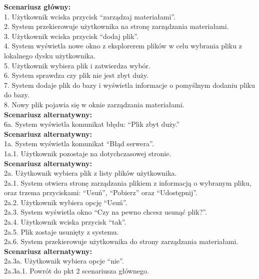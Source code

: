\begin{enumerate}[label=(\Roman*)]
\textbf{Scenariusz główny:}\\
1. Użytkownik wciska przycisk “zarządzaj materiałami”.\\
2. System przekierowuje użytkownika na stronę zarządzania materiałami.\\
3. Użytkownik wciska przycisk “dodaj plik”.\\
4. System wyświetla nowe okno z eksplorerem plików w celu wybrania pliku z
lokalnego dysku użytkownika.\\
5. Użytkownik wybiera plik i zatwierdza wybór.\\
6. System sprawdza czy plik nie jest zbyt duży.\\
7. System dodaje plik do bazy i wyświetla informacje o pomyślnym dodaniu pliku do
bazy.\\
8. Nowy plik pojawia się w oknie zarządzania materiałami.\\
\textbf{Scenariusz alternatywny:}\\
6a. System wyświetla komunikat błędu: “Plik zbyt duży.”\\
\textbf{Scenariusz alternatywny:}\\
1a. System wyświetla komunikat “Błąd serwera”.\\
1a.1. Użytkownik pozostaje na dotychczasowej stronie.\\
\textbf{Scenariusz alternatywny:}\\
2a. Użytkownik wybiera plik z listy plików użytkownika.\\
2a.1. System otwiera stronę zarządzania plikiem z informacją o wybranym pliku, oraz trzema
przyciskami: “Usuń”, “Pobierz” oraz “Udostępnij”.\\
2a.2. Użytkownik wybiera opcję “Usuń”.\\
2a.3. System wyświetla okno “Czy na pewno chcesz usunąć plik?”.\\
2a.4. Użytkownik wciska przycisk “tak”.\\
2a.5. Plik zostaje usunięty z systemu.\\
2a.6. System przekierowuje użytkownika do strony zarządzania materiałami.\\
\textbf{Scenariusz alternatywny:}\\
2a.3a. Użytkownik wybiera opcje “nie”.\\
2a.3a.1. Powrót do pkt 2 scenariusza głównego.\\


\end{enumerate}
